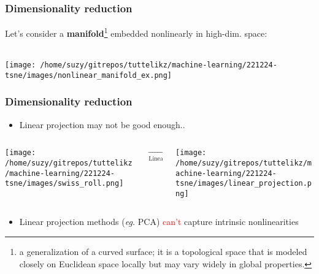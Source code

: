 \documentclass{beamer}
\begin{document}
    \begin{frame}[fragile]
        \frametitle{Dimensionality reduction}
        Let's consider a \textbf{manifold}\footnote{a generalization of a curved surface; it is a topological space that is modeled closely on Euclidean space locally but may vary widely in global properties.} embedded nonlinearly in high-dim. space:\\~\\
        \begin{center}
            \texttt{[image: /home/suzy/gitrepos/tuttelikz/machine-learning/221224-tsne/images/nonlinear\_manifold\_ex.png]}
        \end{center}
        
    \end{frame}

    \begin{frame}[fragile]
        \frametitle{Dimensionality reduction}
        \begin{itemize}
            \item Linear projection may not be good enough..
        \end{itemize}
        \bigskip
        \begin{columns}
            \begin{column}{0.35\textwidth}
                \texttt{[image: /home/suzy/gitrepos/tuttelikz/machine-learning/221224-tsne/images/swiss\_roll.png]}
            \end{column}
            \begin{column}{0.2\textwidth}
                \begin{center}
                    $\xrightarrow[\text{Linear projection}]{}$    
                \end{center}
                
            \end{column}
            \begin{column}{0.35\textwidth}
                \texttt{[image: /home/suzy/gitrepos/tuttelikz/machine-learning/221224-tsne/images/linear\_projection.png]}
            \end{column}
        \end{columns}
        \bigskip
        \begin{itemize}
            \item Linear projection methods (\textit{eg.} PCA) \textcolor{red}{can't} capture intrinsic nonlinearities
        \end{itemize}
    \end{frame}
\end{document}
